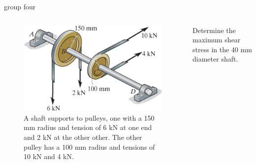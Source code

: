 \documentclass[
  letterpaper,
  ignorenonframetext,
  aspectratio=43,
  handout,
  12pt]{beamer}
\let\Oldincludegraphics\includegraphics
\renewcommand{\includegraphics}[2][]{\Oldincludegraphics[width=\textwidth,height=0.7\textheight,keepaspectratio]{#2}}
\begin{document}
\begin{frame}{group four}
\protect\hypertarget{group-four}{}
\begin{columns}[T]
\begin{column}{0.5\textwidth}
\begin{figure}
\centering
\includegraphics{../images/group-5-4.png}
\caption{A shaft supports to pulleys, one with a 150 mm radius and
tension of 6 kN at one end and 2 kN at the other other. The other pulley
has a 100 mm radius and tensions of 10 kN and 4 kN.}
\end{figure}
\end{column}

\begin{column}{0.5\textwidth}
Determine the maximum shear stress in the 40 mm diameter shaft.
\end{column}
\end{columns}
\end{frame}
\end{document}
